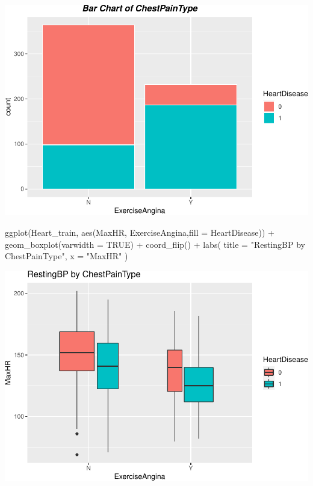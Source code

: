 \documentclass[
]{article}
\newenvironment{Shaded}{\begin{snugshade}}{\end{snugshade}}
\newcommand{\AttributeTok}[1]{\textcolor[rgb]{0.77,0.63,0.00}{#1}}
\newcommand{\ConstantTok}[1]{\textcolor[rgb]{0.00,0.00,0.00}{#1}}
\newcommand{\FunctionTok}[1]{\textcolor[rgb]{0.00,0.00,0.00}{#1}}
\newcommand{\NormalTok}[1]{#1}
\newcommand{\SpecialCharTok}[1]{\textcolor[rgb]{0.00,0.00,0.00}{#1}}
\newcommand{\StringTok}[1]{\textcolor[rgb]{0.31,0.60,0.02}{#1}}
\begin{document}
\includegraphics{PSTAT-131--FINAL-PROJECT-_YIFAN-XU_files/figure-latex/unnamed-chunk-18-1.pdf}

\begin{Shaded}
\begin{Highlighting}[]
\FunctionTok{ggplot}\NormalTok{(Heart\_train, }\FunctionTok{aes}\NormalTok{(MaxHR, ExerciseAngina,}\AttributeTok{fill =}\NormalTok{ HeartDisease)) }\SpecialCharTok{+}
  \FunctionTok{geom\_boxplot}\NormalTok{(}\AttributeTok{varwidth =} \ConstantTok{TRUE}\NormalTok{) }\SpecialCharTok{+} 
  \FunctionTok{coord\_flip}\NormalTok{() }\SpecialCharTok{+}
  \FunctionTok{labs}\NormalTok{(}
    \AttributeTok{title =} \StringTok{"RestingBP by ChestPainType"}\NormalTok{,}
    \AttributeTok{x =} \StringTok{"MaxHR"}
\NormalTok{  )}
\end{Highlighting}
\end{Shaded}

\includegraphics{PSTAT-131--FINAL-PROJECT-_YIFAN-XU_files/figure-latex/unnamed-chunk-19-1.pdf}
\end{document}
